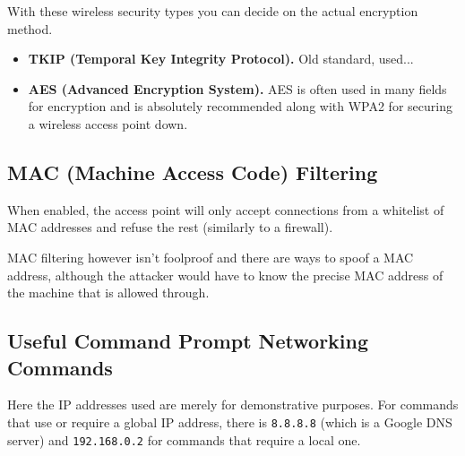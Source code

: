\documentclass{article}
\begin{document}
With these wireless security types you can decide on the actual encryption method.

\begin{itemize}
    \item \textbf{TKIP (Temporal Key Integrity Protocol).} Old standard, used...
    \item \textbf{AES (Advanced Encryption System).} AES is often used in many fields for encryption and is absolutely recommended along with WPA2 for securing a wireless access point down.
\end{itemize}

\subsection{MAC (Machine Access Code) Filtering}


When enabled, the access point will only accept connections from a whitelist of MAC addresses and refuse the rest (similarly to a firewall).

MAC filtering however isn't foolproof and there are ways to spoof a MAC address, although the attacker would have to know the precise MAC address of the machine that is allowed through.

\subsection{Useful Command Prompt Networking Commands}


Here the IP addresses used are merely for demonstrative purposes. For commands that use or require a global IP address, there is \texttt{8.8.8.8} (which is a Google DNS server) and \texttt{192.168.0.2} for commands that require a local one.

\end{document}
